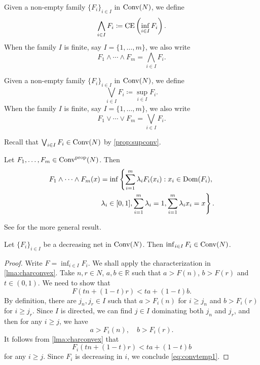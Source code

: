 \begin{definition}\label{def:convwedge}
Given a non-empty family $\{F_i\}_{i\in I}$ in $\mathrm{Conv}(N)$, we define
\[
\bigwedge_{i\in I}F_i\coloneqq \operatorname{CE} \left(\inf_{i\in I} F_i\right).
\]
When the family $I$ is finite, say $I=\{1,\ldots,m\}$, we also write
\[
F_1\land \cdots\land F_m=\bigwedge_{i\in I}F_i.
\]
\end{definition}
\begin{definition}\label{def:convlor}
   Given a non-empty family $\{F_i\}_{i\in I}$ in $\mathrm{Conv}(N)$, we define
\[
\bigvee_{i\in I}F_i\coloneqq \sup_{i\in I} F_i.
\]
When the family $I$ is finite, say $I=\{1,\ldots,m\}$, we also write
\[
F_1\lor \cdots\lor F_m=\bigvee_{i\in I}F_i.
\]
\end{definition}
Recall that $\bigvee_{i\in I}F_i\in \mathrm{Conv}(N)$ by \cref{prop:supconv}.

\begin{proposition}\label{prop:concavhull}
    Let $F_1,\ldots,F_m\in \mathrm{Conv}^{\mathrm{prop}}(N)$. Then
    \[
    \begin{split}
        F_1\land \cdots\land F_m(x)=\inf\left\{\sum_{i=1}^m \lambda_i F_i(x_i):x_i\in \operatorname{Dom}(F_i),\right.\\
        \left.\lambda_i\in [0,1],\sum_{i=1}^m\lambda_i=1, \sum_{i=1}^m\lambda_i x_i=x \right\}.
    \end{split}
    \]
\end{proposition}
See \cite[Theorem~5.6]{Roc70} for the more general result.



\begin{lemma}\label{lma:convdecnet}
    Let $\{F_i\}_{i\in I}$ be a decreasing net in $\mathrm{Conv}(N)$. Then $\inf_{i\in I} F_i\in \mathrm{Conv}(N)$.
\end{lemma}
\begin{proof}
Write $F=\inf_{i\in I} F_i$.
    We shall apply the characterization in \cref{lma:charconvex}. Take $n,r\in N$, $a,b\in \mathbb{R}$ such that $a>F(n)$, $b>F(r)$ and $t\in (0,1)$. We need to show that
    \begin{equation}\label{eq:convtemp1}
    F(tn+(1-t)r)<ta+(1-t)b.
    \end{equation}
    By definition, there are $j_n,j_r\in I$ such that $a>F_i(n)$ for $i\geq j_n$ and $b>F_i(r)$ for $i\geq j_r$. Since $I$ is directed, we can find $j\in I$ dominating both $j_n$ and $j_r$, and then for any $i\geq j$, we have
    \[
    a>F_i(n),\quad b>F_i(r).
    \]
    It follows from \cref{lma:charconvex} that
    \[
    F_i(tn+(1-t)r)<ta+(1-t)b
    \]
    for any $i\geq j$. Since $F_i$ is decreasing in $i$, we conclude \eqref{eq:convtemp1}.
\end{proof}

